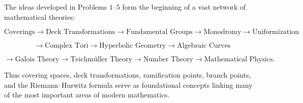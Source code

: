 \documentclass[12pt,a4paper]{article}
\theoremstyle{notespace}
\begin{document}
The ideas developed in Problems \(1\)--\(5\) form the beginning of a vast network of mathematical theories:

\[
\text{Coverings}
\longrightarrow
\text{Deck Transformations}
\longrightarrow
\text{Fundamental Groups}
\longrightarrow
\text{Monodromy}
\longrightarrow
\text{Uniformization}
\]

\[
\longrightarrow
\text{Complex Tori}
\longrightarrow
\text{Hyperbolic Geometry}
\longrightarrow
\text{Algebraic Curves}
\]

\[
\longrightarrow
\text{Galois Theory}
\longrightarrow
\text{Teichmüller Theory}
\longrightarrow
\text{Number Theory}
\longrightarrow
\text{Mathematical Physics}.
\]

Thus covering spaces, deck transformations, ramification points, branch points, and the Riemann--Hurwitz formula serve as foundational concepts linking many of the most important areas of modern mathematics.
\end{document}
